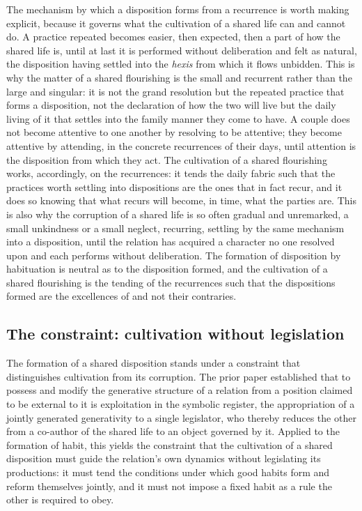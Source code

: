 The mechanism by which a disposition forms from a recurrence is worth making explicit, because it governs what the cultivation of a shared life can and cannot do. A practice repeated becomes easier, then expected, then a part of how the shared life is, until at last it is performed without deliberation and felt as natural, the disposition having settled into the \emph{hexis} from which it flows unbidden. This is why the matter of a shared flourishing is the small and recurrent rather than the large and singular: it is not the grand resolution but the repeated practice that forms a disposition, not the declaration of how the two will live but the daily living of it that settles into the family manner they come to have. A couple does not become attentive to one another by resolving to be attentive; they become attentive by attending, in the concrete recurrences of their days, until attention is the disposition from which they act. The cultivation of a shared flourishing works, accordingly, on the recurrences: it tends the daily fabric such that the practices worth settling into dispositions are the ones that in fact recur, and it does so knowing that what recurs will become, in time, what the parties are. This is also why the corruption of a shared life is so often gradual and unremarked, a small unkindness or a small neglect, recurring, settling by the same mechanism into a disposition, until the relation has acquired a character no one resolved upon and each performs without deliberation. The formation of disposition by habituation is neutral as to the disposition formed, and the cultivation of a shared flourishing is the tending of the recurrences such that the dispositions formed are the excellences of  and not their contraries.

\subsection{The constraint: cultivation without legislation}
\label{p11:sec:prac-constraint}

The formation of a shared disposition stands under a constraint that distinguishes cultivation from its corruption. The prior paper established that to possess and modify the generative structure of a relation from a position claimed to be external to it is exploitation in the symbolic register, the appropriation of a jointly generated generativity to a single legislator, who thereby reduces the other from a co-author of the shared life to an object governed by it. Applied to the formation of habit, this yields the constraint that the cultivation of a shared disposition must guide the relation's own dynamics without legislating its productions: it must tend the conditions under which good habits form and reform themselves jointly, and it must not impose a fixed habit as a rule the other is required to obey.


